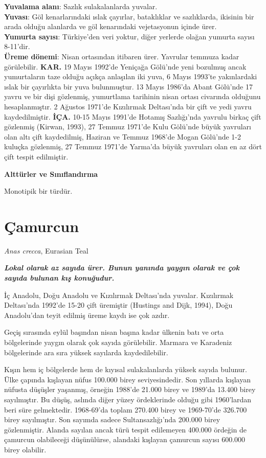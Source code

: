 \documentclass[
  a4paper,
  DIV=11,
  numbers=noendperiod]{scrartcl}
\begin{document}
\textbf{Yuvalama alanı}: Sazlık sulakalanlarda yuvalar.\\
\textbf{Yuvası}: Göl kenarlarındaki ıslak çayırlar, bataklıklar ve
sazlıklarda, ikisinin bir arada olduğu alanlarda ve göl kenarındaki
vejetasyonun içinde ürer.\\
\textbf{Yumurta sayısı}: Türkiye'den veri yoktur, diğer yerlerde olağan
yumurta sayısı 8-11'dir.\\
\textbf{Üreme dönemi}: Nisan ortasından itibaren ürer. Yavrular temmuza
kadar görülebilir. \textbf{KAR.} 19 Mayıs 1992'de Yeniçağa Gölü'nde yeni
bozulmuş ancak yumurtaların taze olduğu açıkça anlaşılan iki yuva, 6
Mayıs 1993'te yakınlardaki ıslak bir çayırlıkta bir yuva bulunmuştur. 13
Mayıs 1986'da Abant Gölü'nde 17 yavru ve bir dişi gözlenmiş, yumurtlama
tarihinin nisan ortası civarında olduğunu hesaplanmıştır. 2 Ağustos
1971'de Kızılırmak Deltası'nda bir çift ve yedi yavru kaydedilmiştir.
\textbf{İÇA.} 10-15 Mayıs 1991'de Hotamış Sazlığı'nda yavrulu birkaç
çift gözlenmiş (Kirwan, 1993), 27 Temmuz 1971'de Kulu Gölü'nde büyük
yavruları olan altı çift kaydedilmiş, Haziran ve Temmuz 1968'de Mogan
Gölü'nde 1-2 kuluçka gözlenmiş, 27 Temmuz 1971'de Yarma'da büyük
yavruları olan en az dört çift tespit edilmiştir.

\textbf{Alttürler ve Sınıflandırma}

Monotipik bir türdür.

\section{Çamurcun}\label{uxe7amurcun}

\emph{Anas crecca}, Eurasian Teal

\textbf{\emph{Lokal olarak az sayıda ürer. Bunun yanında yaygın olarak
ve çok sayıda bulunan kış konuğudur.}}

İç Anadolu, Doğu Anadolu ve Kızılırmak Deltası'nda yuvalar. Kızılırmak
Deltası'nda 1992'de 15-20 çift üremiştir (Hustings and Dijk, 1994), Doğu
Anadolu'dan teyit edilmiş üreme kaydı ise çok azdır.

Geçiş sırasında eylül başından nisan başına kadar ülkenin batı ve orta
bölgelerinde yaygın olarak çok sayıda görülebilir. Marmara ve Karadeniz
bölgelerinde ara sıra yüksek sayılarda kaydedilebilir.

Kışın hem iç bölgelerde hem de kıyısal sulakalanlarda yüksek sayıda
bulunur. Ülke çapında kışlayan nüfus 100.000 birey seviyesindedir. Son
yıllarda kışlayan nüfusta düşüşler yaşanmış, örneğin 1988'de 21.000
birey ve 1989'da 13.400 birey sayılmıştır. Bu düşüş, aslında diğer yüzey
ördeklerinde olduğu gibi 1960'lardan beri süre gelmektedir. 1968-69'da
toplam 270.400 birey ve 1969-70'de 326.700 birey sayılmıştır. Son
sayımda sadece Sultansazlığı'nda 200.000 birey gözlenmiştir. Alanda
sayılan ancak türü tespit edilemeyen 400.000 ördeğin de çamurcun
olabileceği düşünülürse, alandaki kışlayan çamurcun sayısı 600.000 birey
olabilir.
\end{document}

